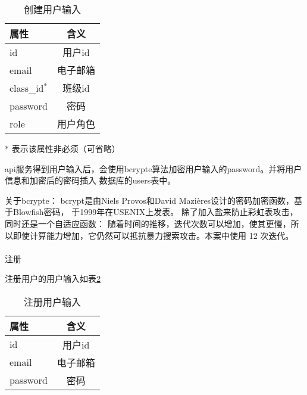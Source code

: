 \begin{table}[htpb!]
    \centering
    \caption{\label{user_in}创建用户输入}
    \begin{threeparttable}
        \begin{tabular}{lc}
            \toprule
            属性          & 含义     \\
            \midrule
            id            & 用户id   \\
            email         & 电子邮箱 \\
            class\_id$^*$ & 班级id   \\
            password      & 密码     \\
            role          & 用户角色 \\
            \bottomrule
        \end{tabular}
        \begin{tablenotes}
            \footnotesize
            \item[$*$] 表示该属性非必须（可省略）
        \end{tablenotes}
    \end{threeparttable}
\end{table}

api服务得到用户输入后，会使用bcrypte算法加密用户输入的password。并将用户信息和加密后的密码插入
数据库的users表中。

关于bcrypte：
bcrypt是由Niels Provos和David Mazières设计的密码加密函数，基于Blowfish密码，
于1999年在USENIX上发表。\cite{bycrypto} 除了加入盐来防止彩虹表攻击，同时还是一个自适应函数：
随着时间的推移，迭代次数可以增加，使其更慢，所以即使计算能力增加，它仍然可以抵抗暴力搜索攻击。本案中使用 12 次迭代。

\paragraph{}注册

注册用户的用户输入如表\ref{sign_up_in}
\begin{table}[htpb!]
    \centering
    \caption{\label{sign_up_in}注册用户输入}
    \begin{threeparttable}
        \begin{tabular}{lc}
            \toprule
            属性     & 含义     \\
            \midrule
            id       & 用户id   \\
            email    & 电子邮箱 \\
            password & 密码     \\
            \bottomrule
        \end{tabular}
    \end{threeparttable}
\end{table}

